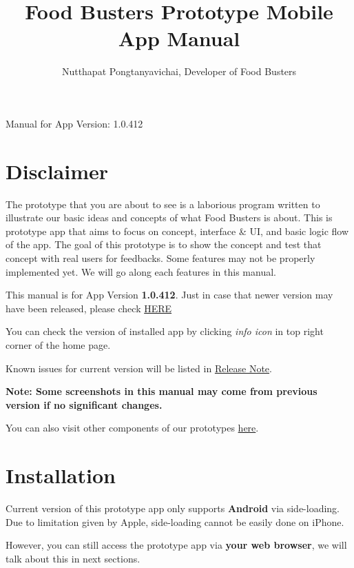 \documentclass[a4paper,12pt]{article}
\begin{document}
\title{\textbf{Food Busters Prototype Mobile App Manual}}
\author{Nutthapat Pongtanyavichai, Developer of Food Busters}

\maketitle
\centerline{\LARGE{Manual for App Version: 1.0.412}}

\tableofcontents

\pagebreak
\section{Disclaimer}

The prototype that you are about to see is a laborious program written to
illustrate our basic ideas and concepts of what Food Busters is about.
This is prototype app that aims to focus on concept, interface \& UI,
and basic logic flow of the app. The goal of this prototype is to show the concept
and test that concept with real users for feedbacks.
Some features may not be properly implemented yet.
We will go along each features in this manual.

This manual is for App Version \textbf{1.0.412}.
Just in case that newer version may have been released,
please check \href{https://github.com/Food-Busters/food_busters/releases}{HERE}

You can check the version of installed app by clicking \textit{info icon}
in top right corner of the home page.

Known issues for current version will be listed in
\href{https://github.com/Food-Busters/food_busters/releases/tag/1.0.412}{Release Note}.

\textbf{Note: Some screenshots in this manual may come from previous version
if no significant changes.}

You can also visit other components of our prototypes
\href{https://food-busters.github.io/}{here}.

\section{Installation}

Current version of this prototype app only supports \textbf{Android} via side-loading.
Due to limitation given by Apple, side-loading cannot be easily done on iPhone.

However, you can still access the prototype app via \textbf{your web browser},
we will talk about this in next sections.
\end{document}
